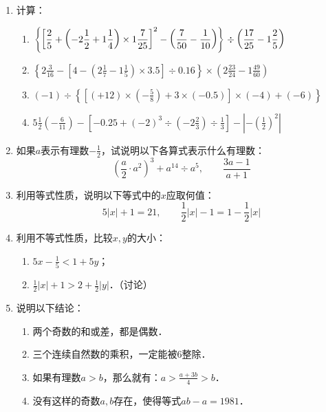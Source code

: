 \begin{enumerate}
\item 计算：
\begin{enumerate}
    \item $\left\{\left[\dfrac{2}{5}+\left(-2\dfrac{1}{2}+1\dfrac{1}{4}\right)\times 1\dfrac{7}{25}\right]^2-\left(\dfrac{7}{50}-\dfrac{1}{10}\right)     \right\}\div\left(\dfrac{17}{25}-1 \dfrac{2}{5}\right) $
    \item $\left\{2 \frac{3}{16}-\left[4-\left(2 \frac{1}{7}-1 \frac{1}{5}\right) \times 3.5\right] \div 0.16\right\} 
\times\left(2 \frac{23}{24}-1 \frac{49}{60}\right) $
\item $(-1)\div \left\{\left[(+12) \times\left(-\frac{5}{8}\right)+3 \times(-0.5) \right] \times(-4)+(-6)\right\} $
\item $5 \frac{1}{2}\left(-\frac{6}{11}\right)-\left[-0.25+(-2)^{3}\div \left(-2 \frac{2}{3}\right) \div \frac{1}{3}\right]-\left|-\left(\frac{1}{2}\right)^{2}\right|$
\end{enumerate}

\item   如果$a$表示有理数$-\frac{1}{2}$，试说明以下各算式表示什么有理数：
\[\left(\frac{a}{2}\cdot a^2\right)^3+a^{14}\div a^5,\qquad \frac{3a-1}{a+1}  \]

\item   利用等式性质，说明以下等式中的$x$应取何值：
\[5|x|+1=21,\qquad \frac{1}{2}|x|-1=1-\frac{1}{2}|x|  \]

\item  利用不等式性质，比较$x,  y$的大小：
\begin{enumerate}
    \item $5x-\frac{1}{5}<1+5y$；
    \item $\frac{1}{2}|x|+1>2+\frac{1}{2}|y|$．（讨论）
\end{enumerate}

\item 说明以下结论：
\begin{enumerate}
    \item 两个奇数的和或差，都是偶数．
    \item 三个连续自然数的乘积，一定能被6整除．
    \item 如果有理数$a>b$，那么就有：$a>\frac{a+3b}{4}>b$．
    \item 没有这样的奇数$a,  b$存在，使得等式$ab-a=1981$．
\end{enumerate}


\end{enumerate}

